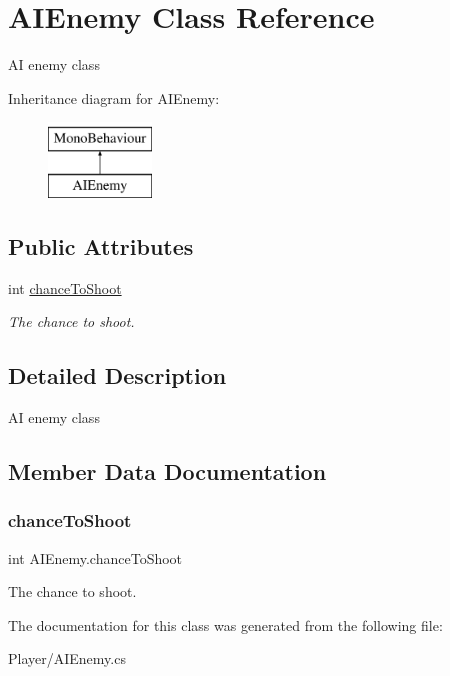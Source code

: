 \hypertarget{class_a_i_enemy}{}\section{A\+I\+Enemy Class Reference}
\label{class_a_i_enemy}


AI enemy class  


Inheritance diagram for A\+I\+Enemy\+:\begin{figure}[H]
\begin{center}
\leavevmode
\includegraphics[height=2.000000cm]{class_a_i_enemy}
\end{center}
\end{figure}
\subsection*{Public Attributes}
\begin{DoxyCompactItemize}
\item 
int \mbox{\hyperlink{class_a_i_enemy_a4514cc12da817389aefe66b88929422a}{chance\+To\+Shoot}}
\begin{DoxyCompactList}\small\item\em The chance to shoot. \end{DoxyCompactList}\end{DoxyCompactItemize}


\subsection{Detailed Description}
AI enemy class 



\subsection{Member Data Documentation}
\mbox{\label{class_a_i_enemy_a4514cc12da817389aefe66b88929422a}} 
\subsubsection{\texorpdfstring{chance\+To\+Shoot}{chanceToShoot}}
{\footnotesize\ttfamily int A\+I\+Enemy.\+chance\+To\+Shoot}



The chance to shoot. 



The documentation for this class was generated from the following file\+:\begin{DoxyCompactItemize}
\item 
Player/A\+I\+Enemy.\+cs\end{DoxyCompactItemize}
